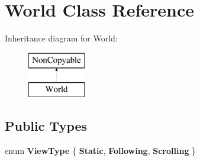 \hypertarget{class_world}{}\section{World Class Reference}
\label{class_world}
Inheritance diagram for World\+:\begin{figure}[H]
\begin{center}
\leavevmode
\includegraphics[height=2.000000cm]{class_world}
\end{center}
\end{figure}
\subsection*{Public Types}
\begin{DoxyCompactItemize}
\item 
\hypertarget{class_world_acb5af5bcc28f7190c116f49a6f4bd463}{}enum {\bfseries View\+Type} \{ {\bfseries Static}, 
{\bfseries Following}, 
{\bfseries Scrolling}
 \}\label{class_world_acb5af5bcc28f7190c116f49a6f4bd463}

\end{DoxyCompactItemize}
